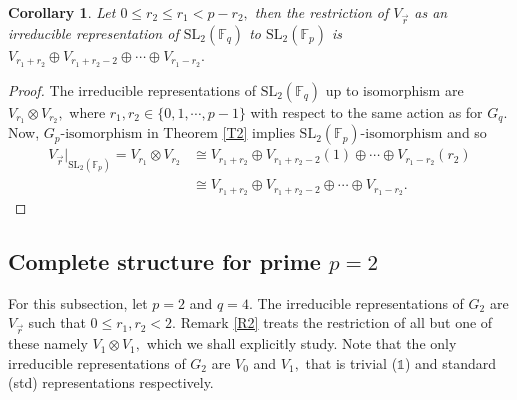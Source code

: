 \documentclass[10pt, reqno]{amsart}
\def\F{{\mathbb F}}
\def\Gq{{G_q}}
\def\Gp{{G_p}}
\numberwithin{equation}{section}
\newtheorem{corollary}[theorem]{Corollary}%
\theoremstyle{remark}
\begin{document}
	\begin{corollary}
		Let $0\leq r_2\leq r_1<p-r_2,$ then the restriction of $V_{\vec{r}}$ as an irreducible representation of $\text{SL}_2(\F_q)$ to $\text{SL}_2(\F_p)$ is $V_{r_1+r_2}\oplus V_{r_1+r_2-2}\oplus\cdots\oplus V_{r_1-r_2}.$
	\end{corollary}
	\begin{proof}
		The irreducible representations of $\text{SL}_2(\F_q)$ up to isomorphism are $V_{r_1}\otimes V_{r_2},$ where $r_1,r_2\in\{0,1,\cdots, p-1\}$ with respect to the same action as for $\Gq.$ Now, $\Gp\text{-isomorphism}$ in Theorem \ref{T2} implies $\text{SL}_2(\F_p)\text{-isomorphism}$ and so 
		\begin{align*}
			{V_{\vec{r}}|}_{\text{SL}_2(\F_p)}=V_{r_1}\otimes V_{r_2}&\cong V_{r_1+r_2}\oplus V_{r_1+r_2-2}(1)\oplus \cdots\oplus V_{r_1-r_2}(r_2)\\
			&\cong V_{r_1+r_2}\oplus V_{r_1+r_2-2}\oplus\cdots\oplus V_{r_1-r_2}.        
		\end{align*}
	\end{proof}
	
	\subsection{Complete structure for prime $p=2$}\label{SS1}
	For this subsection, let $p=2$ and $q=4.$  The irreducible representations of $G_2$ are $V_{\vec{r}}$ such that $0\leq r_1,r_2<2.$ Remark \ref{R2} treats the restriction of all but one of these namely $V_1\otimes V_1,$ which we shall explicitly study. Note that the only irreducible representations of $G_2$ are $V_0$ and $V_1,$ that is trivial ($\mathds{1}$) and standard (std) representations respectively.
	
\end{document}
